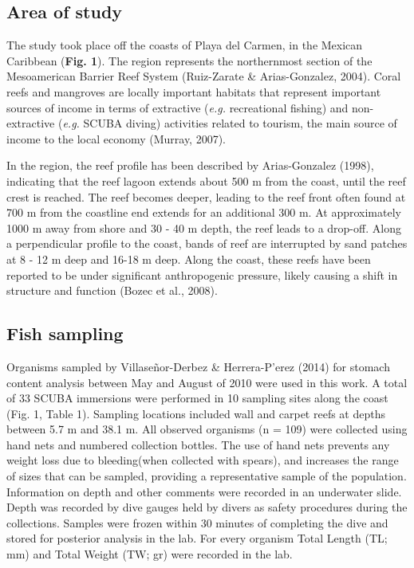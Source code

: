 \documentclass[12pt,]{article}
\begin{document}
\subsection{Area of study}\label{area-of-study}

The study took place off the coasts of Playa del Carmen, in the Mexican
Caribbean (\textbf{Fig. 1}). The region represents the northernmost
section of the Mesoamerican Barrier Reef System (Ruiz-Zarate \&
Arias-Gonzalez, 2004). Coral reefs and mangroves are locally important
habitats that represent important sources of income in terms of
extractive (\emph{e.g.} recreational fishing) and non-extractive
(\emph{e.g.} SCUBA diving) activities related to tourism, the main
source of income to the local economy (Murray, 2007).

In the region, the reef profile has been described by Arias-Gonzalez
(1998), indicating that the reef lagoon extends about 500 m from the
coast, until the reef crest is reached. The reef becomes deeper, leading
to the reef front often found at 700 m from the coastline end extends
for an additional 300 m. At approximately 1000 m away from shore and 30
- 40 m depth, the reef leads to a drop-off. Along a perpendicular
profile to the coast, bands of reef are interrupted by sand patches at 8
- 12 m deep and 16-18 m deep. Along the coast, these reefs have been
reported to be under significant anthropogenic pressure, likely causing
a shift in structure and function (Bozec et al., 2008).

\subsection{Fish sampling}\label{fish-sampling}

Organisms sampled by Villaseñor-Derbez \& Herrera-P\a'erez (2014) for
stomach content analysis between May and August of 2010 were used in
this work. A total of 33 SCUBA immersions were performed in 10 sampling
sites along the coast (Fig. 1, Table 1). Sampling locations included
wall and carpet reefs at depths between 5.7 m and 38.1 m. All observed
organisms (n = 109) were collected using hand nets and numbered
collection bottles. The use of hand nets prevents any weight loss due to
bleeding(when collected with spears), and increases the range of sizes
that can be sampled, providing a representative sample of the
population. Information on depth and other comments were recorded in an
underwater slide. Depth was recorded by dive gauges held by divers as
safety procedures during the collections. Samples were frozen within 30
minutes of completing the dive and stored for posterior analysis in the
lab. For every organism Total Length (TL; mm) and Total Weight (TW; gr)
were recorded in the lab.
\end{document}
